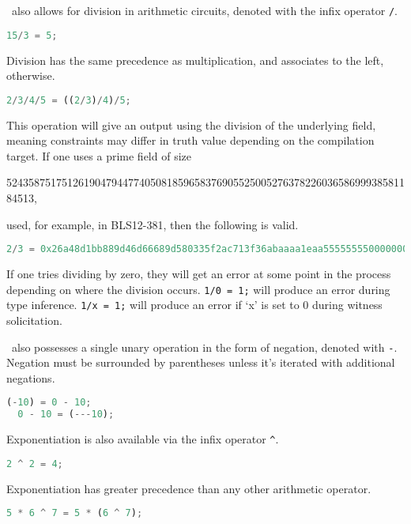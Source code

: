 \vampir\ also allows for division in arithmetic circuits, denoted with the infix operator \lstinline{/}.

\begin{lstlisting}[language=Python]
  15/3 = 5;
\end{lstlisting}

Division has the same precedence as multiplication, and associates to the left, otherwise. 

\begin{lstlisting}[language=Python]
  2/3/4/5 = ((2/3)/4)/5;
\end{lstlisting}

This operation will give an output using the division of the underlying field, meaning constraints may differ in truth value depending on the compilation target. If one uses a prime field of size

52435875175126190479447740508185965837690552500527637822603658699938581184513,

used, for example, in BLS12-381, then the following is valid.

\begin{lstlisting}[language=Python]
  2/3 = 0x26a48d1bb889d46d66689d580335f2ac713f36abaaaa1eaa5555555500000001;
\end{lstlisting}
  
If one tries dividing by zero, they will get an error at some point in the process depending on where the division occurs. \lstinline{1/0 = 1;} will produce an error during type inference. \lstinline{1/x = 1;} will produce an error if `x' is set to 0 during witness solicitation.

\vampir\ also possesses a single unary operation in the form of negation, denoted with \lstinline{-}. Negation must be surrounded by parentheses unless it's iterated with additional negations.

\begin{lstlisting}[language=Python]
  (-10) = 0 - 10;
  0 - 10 = (---10);
\end{lstlisting}

Exponentiation is also available via the infix operator \lstinline{^}.

\begin{lstlisting}[language=Python]
  2 ^ 2 = 4;
\end{lstlisting}

Exponentiation has greater precedence than any other arithmetic operator. 

\begin{lstlisting}[language=Python]
  5 * 6 ^ 7 = 5 * (6 ^ 7);
\end{lstlisting}

